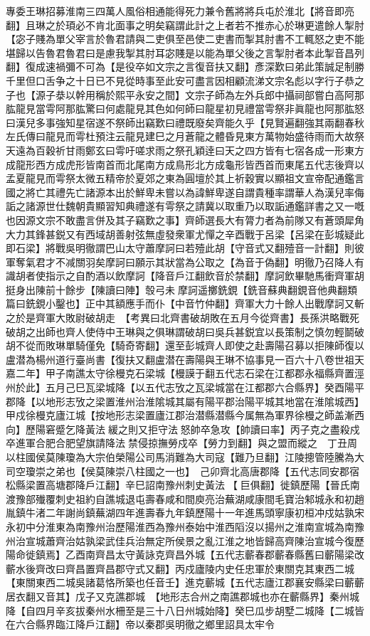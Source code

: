 專委王琳招募淮南三四萬人風俗相通能得死力兼令舊將將兵屯於淮北【將音即亮翻】且琳之於頊必不肯北面事之明矣竊謂此計之上者若不推赤心於琳更遣餘人掣肘【宓子賤為單父宰言於魯君請與二吏俱至邑使二吏書而掣其肘書不工輒怒之吏不能堪歸以告魯君魯君曰是慮我掣其肘耳宓賤是以能為單父後之言掣肘者本此掣音昌列翻】復成速禍彌不可為【是役卒如文宗之言復音扶又翻】彥深歎曰弟此策誠足制勝千里但口舌争之十日已不見從時事至此安可盡言因相顧流涕文宗名彪以字行子恭之子也【源子㳟以幹用稱於熙平永安之間】文宗子師為左外兵郎中攝祠部嘗白高阿那肱龍見當雩阿那肱驚曰何處龍見其色如何師曰龍星初見禮當雩祭非眞龍也阿那肱怒曰漢兒多事強知星宿遂不祭師出竊歎曰禮既廢矣齊能久乎【見賢遍翻強其兩翻春秋左氏傳曰龍見而雩杜預注云龍見建巳之月蒼龍之體昏見東方萬物始盛待雨而大故祭天遠為百穀祈甘雨鄭玄曰雩吁嗟求雨之祭孔穎逹曰天之四方皆有七宿各成一形東方成龍形西方成虎形皆南首而北尾南方成鳥形北方成龜形皆西首而東尾五代志後齊以孟夏龍見而雩祭太微五精帝於夏郊之東為圓壇於其上祈穀實以顯祖文宣帝配通鑑言國之將亡其禮先亡諸源本出於鮮卑未嘗以為諱鮮卑遂自謂貴種率謂華人為漢兒率侮詬之諸源世仕魏朝貴顯習知典禮遂有雩祭之請冀以取重乃以取詬通鑑詳書之又一嘅也因源文宗不敢盡言併及其子竊歎之事】齊師選長大有膂力者為前隊又有蒼頭犀角大力其鋒甚鋭又有西域胡善射弦無虛發衆軍尤憚之辛酉戰于呂梁【呂梁在彭城疑此即石梁】將戰吳明徹謂巴山太守蕭摩訶曰若殪此胡【守音式又翻殪音一計翻】則彼軍奪氣君才不减關羽矣摩訶曰願示其狀當為公取之【為音于偽翻】明徹乃召降人有識胡者使指示之自酌酒以飲摩訶【降音戶江翻飲音於禁翻】摩訶飲畢馳馬衝齊軍胡挺身出陳前十餘步【陳讀曰陣】彀弓未摩訶遥擲銑鋧【銑音蘇典翻鋧音他典翻類篇曰銑鋧小鑿也】正中其額應手而仆【中音竹仲翻】齊軍大力十餘人出戰摩訶又斬之於是齊軍大敗尉破胡走　【考異曰北齊書破胡敗在五月今從齊書】長孫洪略戰死破胡之出師也齊人使侍中王琳與之俱琳謂破胡曰吳兵甚鋭宜以長策制之慎勿輕鬬破胡不從而敗琳單騎僅免【騎奇寄翻】還至彭城齊人即使之赴壽陽召募以拒陳師復以盧潜為楊州道行臺尚書【復扶又翻盧潜在壽陽與王琳不協事見一百六十八卷世祖天嘉二年】甲子南譙太守徐槾克石梁城【槾謨于翻五代志石梁在江都郡永福縣齊置涇州於此】五月己巳瓦梁城降【以五代志攷之瓦梁城當在江都郡六合縣界】癸酉陽平郡降【以地形志攷之梁置淮州治淮隂城其屬有陽平郡治陽平城其地當在淮隂城西】甲戍徐槾克廬江城【按地形志梁置廬江郡治潜縣潜縣今属無為軍界徐槾之師盖漸西向】歷陽窘蹙乞降黃法緩之則又拒守法怒帥卒急攻【帥讀曰率】丙子克之盡殺戍卒進軍合肥合肥望旗請降法禁侵掠撫勞戍卒【勞力到翻】與之盟而縱之　丁丑周以柱國侯莫陳瓊為大宗伯榮陽公司馬消難為大司寇【難乃旦翻】江陵摠管陸騰為大司空瓊崇之弟也【侯莫陳崇八柱國之一也】　己卯齊北高唐郡降【五代志同安郡宿松縣梁置高塘郡降戶江翻】辛巳詔南豫州刺史黃法【巨俱翻】徙鎮歷陽【晉氏南渡豫部殱覆刺史祖約自譙城退屯壽春咸和間庾亮治蕪湖咸康間毛寶治邾城永和初趙胤鎮牛渚二年謝尚鎮蕪湖四年進壽春九年鎮歷陽十一年進馬頭寧康初桓冲戍姑孰宋永初中分淮東為南豫州治歷陽淮西為豫州泰始中淮西䧟沒以揚州之淮南宣城為南豫州治宣城蕭齊治姑孰梁武佳兵治無定所侯景之亂江淮之地皆歸高齊陳治宣城今復歷陽命徙鎮焉】乙酉南齊昌太守黃詠克齊昌外城【五代志蘄春郡蘄春縣舊曰蘄陽梁改蘄水後齊改曰齊昌置齊昌郡守式又翻】丙戍廬陵内史任忠軍於東關克其東西二城【東關東西二城吳諸葛恪所築也任音壬】進克蘄城【五代志廬江郡襄安縣梁曰蘄蘄居衣翻又音其】戊子又克譙郡城　【地形志合州之南譙郡城也亦在蘄縣界】秦州城降【自四月辛亥拔秦州水柵至是三十八日州城始降】癸巳瓜步胡墅二城降【二城皆在六合縣界臨江降戶江翻】帝以秦郡吳明徹之鄉里詔具太牢令